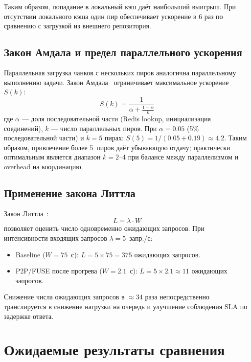 Таким образом, попадание в локальный кэш даёт наибольший выигрыш. При отсутствии локального кэша один пир обеспечивает ускорение в 6 раз по сравнению с загрузкой из внешнего репозитория.

\subsection*{Закон Амдала и предел параллельного ускорения}

Параллельная загрузка чанков с нескольких пиров аналогична параллельному выполнению задачи. Закон Амдала~\cite{amdahl_law} ограничивает максимальное ускорение $S(k)$:
\[
  S(k) = \frac{1}{\alpha + \frac{1-\alpha}{k}}
\]
где $\alpha$ --- доля последовательной части (Redis lookup, инициализация соединений), $k$ --- число параллельных пиров. При $\alpha = 0.05$ (5\% последовательной части) и $k = 5$ пирах: $S(5) = 1 / (0.05 + 0.19) \approx 4.2$. Таким образом, привлечение более 5~пиров даёт убывающую отдачу; практически оптимальным является диапазон $k = 2$--$4$ при балансе между параллелизмом и overhead на координацию.

\subsection*{Применение закона Литтла}

Закон Литтла~\cite{little1961}:
\begin{equation}
  L = \lambda \cdot W
  \label{eq:little}
\end{equation}
позволяет оценить число одновременно ожидающих запросов. При интенсивности входящих запросов $\lambda = 5$~запр./с:
\begin{itemize}[leftmargin=*]
  \item Baseline ($W = 75$~с): $L = 5 \times 75 = 375$ ожидающих запросов.
  \item P2P/FUSE после прогрева ($W = 2.1$~с): $L = 5 \times 2.1 \approx 11$ ожидающих запросов.
\end{itemize}

Снижение числа ожидающих запросов в $\approx 34$ раза непосредственно транслируется в снижение нагрузки на очередь и улучшение соблюдения SLA по задержке ответа.

\section{Ожидаемые результаты сравнения}

